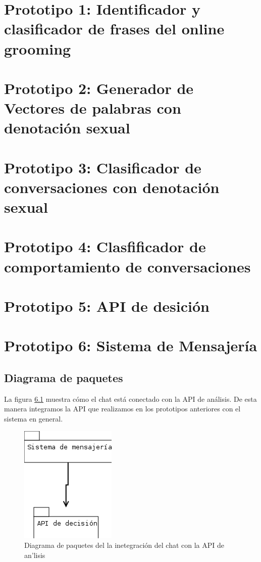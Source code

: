 \documentclass[oneside,10pt]{book}
\begin{document}
\chapter{Prototipo 1: Identificador y clasificador de frases del online grooming}


\chapter{Prototipo 2:  Generador de Vectores de palabras con denotaci\'on sexual}




\chapter{Prototipo 3: Clasificador de conversaciones con denotaci\'on sexual}


\chapter{Prototipo 4: Clasfificador de comportamiento de conversaciones}



\chapter{Prototipo 5: API de desici\'on}


\chapter{Prototipo 6: Sistema de Mensajer\'ia}







\section{Diagrama de paquetes}
La figura \ref{fig:paquetes} muestra c\'omo el chat est\'a conectado con la API de an\'alisis. De esta manera integramos la API que realizamos en los prototipos anteriores con el sistema en general.
\begin{figure}
\includegraphics[scale=.4]{images/diagramapaquetes}
\caption{Diagrama de paquetes del la inetegraci\'on del chat con la API de an\a'lisis}
\label{fig:paquetes}
\end{figure}
\end{document}
